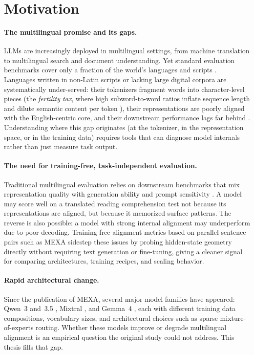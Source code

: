 \section{Motivation}
\label{sec:intro-motivation}

\paragraph{The multilingual promise and its gaps.}
LLMs are increasingly deployed in multilingual settings, from machine translation to multilingual search and document understanding. Yet standard evaluation benchmarks cover only a fraction of the world's languages and scripts \citep{bandarkar2024belebele, lai2023okapi}. Languages written in non-Latin scripts or lacking large digital corpora are systematically under-served: their tokenizers fragment words into character-level pieces (the \emph{fertility tax}, where high subword-to-word ratios inflate sequence length and dilute semantic content per token \citep{petrov2023tokenizer}), their representations are poorly aligned with the English-centric core, and their downstream performance lags far behind \citep{nllbteam2022}. Understanding where this gap originates (at the tokenizer, in the representation space, or in the training data) requires tools that can diagnose model internals rather than just measure task output.

\paragraph{The need for training-free, task-independent evaluation.}
Traditional multilingual evaluation relies on downstream benchmarks that mix representation quality with generation ability and prompt sensitivity \citep{bandarkar2024belebele, lai2023okapi, kargaran2025mexa}. A model may score well on a translated reading comprehension test not because its representations are aligned, but because it memorized surface patterns. The reverse is also possible: a model with strong internal alignment may underperform due to poor decoding. Training-free alignment metrics based on parallel sentence pairs such as MEXA sidestep these issues by probing hidden-state geometry directly without requiring text generation or fine-tuning, giving a cleaner signal for comparing architectures, training recipes, and scaling behavior.

\paragraph{Rapid architectural change.}
Since the publication of MEXA, several major model families have appeared: Qwen~3 and~3.5 \citep{yang2025qwen3}, Mixtral \citep{jiang2024mixtral}, and Gemma~4 \citep{gemmateam2026gemma4technicalreport}, each with different training data compositions, vocabulary sizes, and architectural choices such as sparse mixture-of-experts routing. Whether these models improve or degrade multilingual alignment is an empirical question the original study could not address. This thesis fills that gap.


